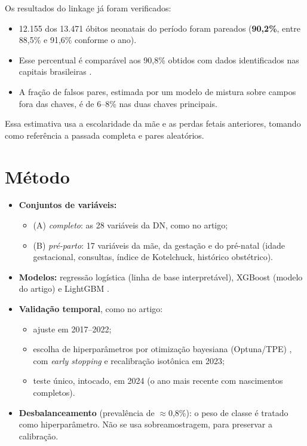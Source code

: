 \documentclass[12pt]{article}
\begin{document}
Os resultados do linkage já foram verificados:
\begin{itemize}
  \item 12.155 dos 13.471 óbitos neonatais do período foram pareados (\textbf{90,2\%}, entre 88,5\% e 91,6\% conforme o ano).
  \item Esse percentual é comparável aos 90,8\% obtidos com dados identificados nas capitais brasileiras \cite{maia2017}.
  \item A fração de falsos pares, estimada por um modelo de mistura sobre campos fora das chaves, é de 6--8\% nas duas chaves principais.
\end{itemize}
Essa estimativa usa a escolaridade da mãe e as perdas fetais anteriores, tomando como referência a passada completa e pares aleatórios.

\section{Método}

\begin{itemize}
  \item \textbf{Conjuntos de variáveis:}
    \begin{itemize}
      \item (A) \textit{completo}: as 28 variáveis da DN, como no artigo;
      \item (B) \textit{pré-parto}: 17 variáveis da mãe, da gestação e do pré-natal (idade gestacional, consultas, índice de Kotelchuck, histórico obstétrico).
    \end{itemize}
  \item \textbf{Modelos:} regressão logística (linha de base interpretável), XGBoost (modelo do artigo) \cite{chen2016} e LightGBM \cite{ke2017}.
  \item \textbf{Validação temporal}, como no artigo:
    \begin{itemize}
      \item ajuste em 2017--2022;
      \item escolha de hiperparâmetros por otimização bayesiana (Optuna/TPE) \cite{akiba2019}, com \textit{early stopping} e recalibração isotônica em 2023;
      \item teste único, intocado, em 2024 (o ano mais recente com nascimentos completos).
    \end{itemize}
  \item \textbf{Desbalanceamento} (prevalência de $\approx$0,8\%): o peso de classe é tratado como hiperparâmetro. Não se usa sobreamostragem, para preservar a calibração.
\end{itemize}
\end{document}

